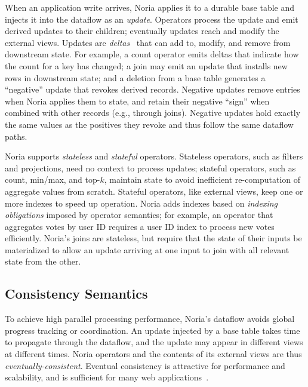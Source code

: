 When an application write arrives, Noria applies it to a durable base table and
injects it into the dataflow as an \emph{update}. Operators process the update
and emit derived updates to their children; eventually updates reach and modify
the external views. Updates are \emph{deltas}~\cite{roll, differential-dataflow}
that can add to, modify, and remove from downstream state. For example, a count
operator emits deltas that indicate how the count for a key has changed; a join
may emit an update that installs new rows in downstream state; and a deletion
from a base table generates a ``negative'' update that revokes derived records.
Negative updates remove entries when Noria applies them to state, and retain
their negative ``sign'' when combined with other records (e.g., through joins).
Negative updates hold exactly the same values as the positives they revoke and
thus follow the same dataflow paths.

Noria supports \emph{stateless} and \emph{stateful} operators. Stateless
operators, such as filters and projections, need no context to process updates;
stateful operators, such as count, min/max, and top-$k$, maintain state to avoid
inefficient re-computation of aggregate values from scratch. Stateful operators,
like external views, keep one or more indexes to speed up operation. Noria adds
indexes based on \emph{indexing obligations} imposed by operator semantics; for
example, an operator that aggregates votes by user ID requires a user ID index
to process new votes efficiently. Noria's joins are stateless, but require that
the state of their inputs be materialized to allow an update arriving at one
input to join with all relevant state from the other.

\subsection{Consistency Semantics}

To achieve high parallel processing performance, Noria's dataflow avoids
global progress tracking or coordination. An update injected by a base table
takes time to propagate through the dataflow, and the update may appear in
different views at different times. Noria operators and the contents of its
external views are thus \emph{eventually-consistent}. Eventual consistency is
attractive for performance and scalability, and is sufficient for many web
applications~\cite{eventually-consistent, memcached-facebook, pnuts}.

